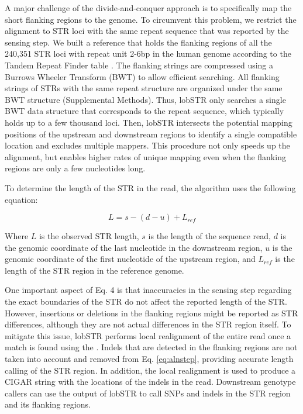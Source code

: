 A major challenge of the divide-and-conquer approach is to specifically map the short flanking regions to the genome. To circumvent this problem, we restrict the alignment to STR loci with the same repeat sequence that was reported by the sensing step. We built a reference that holds the flanking regions of all the 240,351 STR loci with repeat unit 2-6bp in the human genome according to the Tandem Repeat Finder table \cite{Benson1999}. The flanking strings are compressed using a Burrows Wheeler Transform \cite{BurrowsWheeler1994} (BWT) to allow efficient searching. All flanking strings of STRs with the same repeat structure are organized under the same BWT structure (Supplemental Methods). Thus, lobSTR only searches a single BWT data structure that corresponds to the repeat sequence, which typically holds up to a few thousand loci. Then, lobSTR intersects the potential mapping positions of the upstream and downstream regions to identify a single compatible location and excludes multiple mappers. This procedure not only speeds up the alignment, but enables higher rates of unique mapping even when the flanking regions are only a few nucleotides long. 

To determine the length of the STR in the read, the algorithm uses the following equation: 

\begin{equation} \label{eq:alnstep}
L = s - (d - u ) + L_{ref}                                                                  
\end{equation}

Where $L$ is the observed STR length, $s$ is the length of the sequence read, $d$ is the genomic coordinate of the last nucleotide in the downstream region, $u$ is the genomic coordinate of the first nucleotide of the upstream region, and $L_{ref}$ is the length of the STR region in the reference genome. 

One important aspect of Eq. 4 is that inaccuracies in the sensing step regarding the exact boundaries of the STR do not affect the reported length of the STR. However, insertions or deletions in the flanking regions might be reported as STR differences, although they are not actual differences in the STR region itself. To mitigate this issue, lobSTR performs local realignment of the entire read once a match is found using the \cite{NeedlemanWunsch1970}. Indels that are detected in the flanking regions are not taken into account and removed from Eq. \ref{eq:alnstep}, providing accurate length calling of the STR region. In addition, the local realignment is used to produce a CIGAR string with the locations of the indels in the read. Downstream genotype callers can use the output of lobSTR to call SNPs and indels in the STR region and its flanking regions. 

